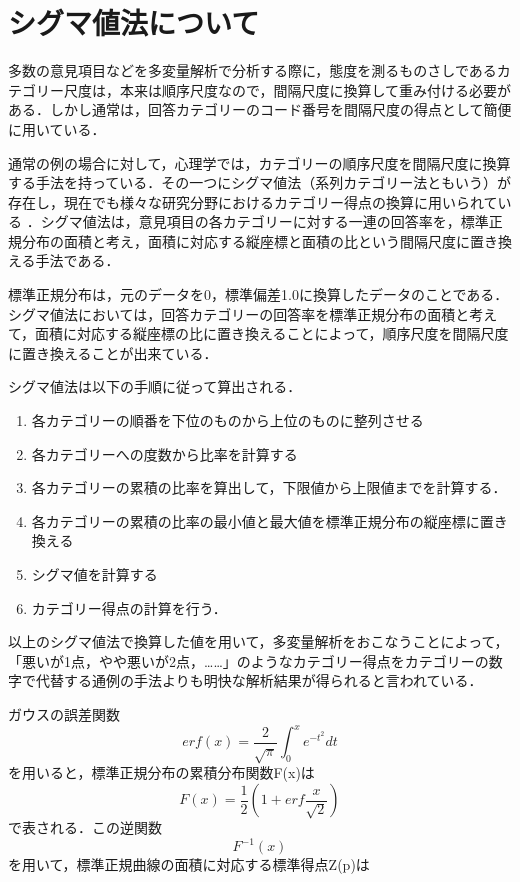 \documentclass[shuuron]{kuee}
\begin{document}
\chapter{シグマ値法について}
多数の意見項目などを多変量解析で分析する際に，態度を測るものさしであるカテゴリー尺度は，本来は順序尺度なので，間隔尺度に換算して重み付ける必要がある．しかし通常は，回答カテゴリーのコード番号を間隔尺度の得点として簡便に用いている．

通常の例の場合に対して，心理学では，カテゴリーの順序尺度を間隔尺度に換算する手法を持っている．その一つにシグマ値法（系列カテゴリー法ともいう）が存在し\cite{likert1932technique}，現在でも様々な研究分野におけるカテゴリー得点の換算に用いられている\cite{シグマ値法使ってる} \cite{岩本隆2016人事}．シグマ値法は，意見項目の各カテゴリーに対する一連の回答率を，標準正規分布の面積と考え，面積に対応する縦座標と面積の比という間隔尺度に置き換える手法である．

標準正規分布は，元のデータを0，標準偏差1.0に換算したデータのことである．シグマ値法においては，回答カテゴリーの回答率を標準正規分布の面積と考えて，面積に対応する縦座標の比に置き換えることによって，順序尺度を間隔尺度に置き換えることが出来ている．

シグマ値法は以下の手順に従って算出される．
\begin{enumerate}
  \item 各カテゴリーの順番を下位のものから上位のものに整列させる
  \item 各カテゴリーへの度数から比率を計算する
  \item 各カテゴリーの累積の比率を算出して，下限値から上限値までを計算する．
  \item 各カテゴリーの累積の比率の最小値と最大値を標準正規分布の縦座標に置き換える
  \item シグマ値を計算する
  \item カテゴリー得点の計算を行う．
\end{enumerate}

以上のシグマ値法で換算した値を用いて，多変量解析をおこなうことによって，「悪いが1点，やや悪いが2点，……」のようなカテゴリー得点をカテゴリーの数字で代替する通例の手法よりも明快な解析結果が得られると言われている．

ガウスの誤差関数
\begin{equation}
  erf(x) = \frac{2}{\sqrt{\pi}}\int_0^x e^{-t^2} dt
\end{equation}
を用いると，標準正規分布の累積分布関数F(x)は
\begin{equation}
  F(x) = \frac{1}{2}(1+erf\frac{x}{\sqrt{2}})
\end{equation}
で表される．この逆関数\begin{equation}F^{-1}(x)\end{equation}を用いて，標準正規曲線の面積に対応する標準得点Z(p)は
\end{document}
